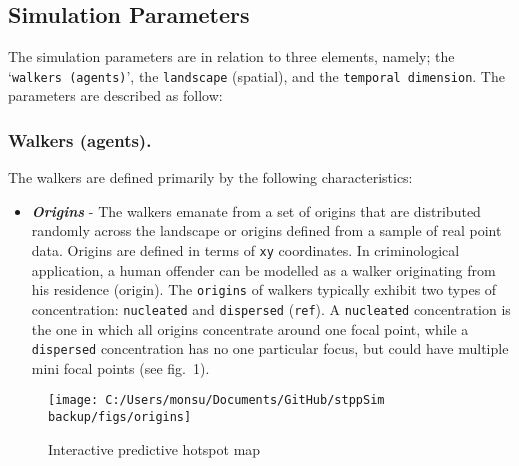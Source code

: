 \documentclass[
  16pt,
]{article}
\providecommand{\tightlist}{%
  \setlength{\itemsep}{0pt}\setlength{\parskip}{0pt}}
\begin{document}
\hypertarget{simulation-parameters}{%
\subsection{Simulation Parameters}\label{simulation-parameters}}

The simulation parameters are in relation to three elements, namely; the
`\texttt{walkers\ (agents)}', the \texttt{landscape} (spatial), and the
\texttt{temporal\ dimension}. The parameters are described as follow:

\hypertarget{walkers-agents.}{%
\subsubsection{Walkers (agents).}\label{walkers-agents.}}

The walkers are defined primarily by the following characteristics:

\begin{itemize}
\tightlist
\item
  \textbf{\emph{Origins}} - The walkers emanate from a set of origins
  that are distributed randomly across the landscape or origins defined
  from a sample of real point data. Origins are defined in terms of
  \texttt{xy} coordinates. In criminological application, a human
  offender can be modelled as a walker originating from his residence
  (origin). The \texttt{origins} of walkers typically exhibit two types
  of concentration: \texttt{nucleated} and \texttt{dispersed}
  (\texttt{ref}). A \texttt{nucleated} concentration is the one in which
  all origins concentrate around one focal point, while a
  \texttt{dispersed} concentration has no one particular focus, but
  could have multiple mini focal points (see fig.~1).
\end{itemize}

\begin{figure}

\hfill{}\texttt{[image: C:/Users/monsu/Documents/GitHub/stppSim backup/figs/origins]} 

\caption{Interactive predictive hotspot map}\label{fig:fig1}
\end{figure}
\end{document}
